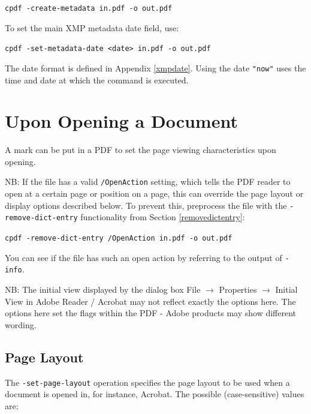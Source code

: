 \documentclass{book}
\begin{document}
  \begin{framed}
    \noindent\small\verb!cpdf -create-metadata in.pdf -o out.pdf!
  \end{framed}

  \noindent To set the main XMP metadata date field, use:

  \begin{framed}
    \noindent\small\verb!cpdf -set-metadata-date <date> in.pdf -o out.pdf!
  \end{framed}

\noindent The date format is defined in Appendix \ref{xmpdate}. Using the date \texttt{"now"} uses the time and date at which the command is executed.


\section{Upon Opening a Document}

A mark can be put in a PDF to set the page viewing characteristics upon opening.

NB: If the file has a valid \texttt{/OpenAction} setting, which tells the PDF reader to open at a certain page or position on a page, this can override the page layout or display options described below. To prevent this, preprocess the file with the \texttt{-remove-dict-entry} functionality from Section \ref{removedictentry}:

  \begin{framed}
    \noindent\small\verb!cpdf -remove-dict-entry /OpenAction in.pdf -o out.pdf!
  \end{framed}

\noindent You can see if the file has such an open action by referring to the output of \texttt{-info}.

NB: The initial view displayed by the dialog box File $\rightarrow$ Properties $\rightarrow$ Initial View in Adobe Reader / Acrobat may not reflect exactly the options here. The options here set the flags within the PDF - Adobe products may show different wording.

  \subsection{Page Layout}
  The \texttt{-set-page-layout} operation specifies the page layout to be used
when a document is opened in, for instance, Acrobat. The possible
(case-sensitive) values are:
\end{document}
